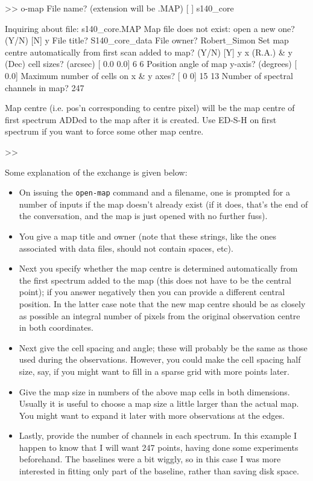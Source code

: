 \documentclass[11pt,twoside]{starlink}
\begin{document}
\begin{terminalv}
>> o-map
File name? (extension will be .MAP) [    ] s140_core

Inquiring about file: s140_core.MAP
Map file does not exist: open a new one? (Y/N) [N] y
File title? S140_core_data
File owner? Robert_Simon
Set map centre automatically from first scan added to map? (Y/N) [Y] y
x (R.A.) & y (Dec) cell sizes? (arcsec) [  0.0   0.0] 6 6
Position angle of map y-axis? (degrees) [   0.0]
Maximum number of cells on x & y axes? [  0   0] 15 13
Number of spectral channels in map? 247

Map centre (i.e. pos'n corresponding to centre pixel)
will be the map centre of first spectrum ADDed to the
map after it is created. Use ED-S-H on first spectrum
if you want to force some other map centre.

>>
\end{terminalv}

Some explanation of the exchange is given below:
\begin{itemize}
\item
On issuing the \texttt{open-map} command and a filename, one is prompted
for a number of inputs if the map doesn't already exist (if it does,
that's the end of the conversation, and the map is just opened with no
further fuss).
\item
You give a map title and owner (note that these strings, like the ones
associated with data files, should not contain spaces, etc).
\item
Next you specify whether the map centre is determined automatically
from the first spectrum added to the map (this does not have to be the
central point); if you answer negatively then you can provide a
different central position. In the latter case note that the new map
centre should be as closely as possible an integral number of pixels
from the original observation centre in both coordinates.
\item
Next give the cell spacing and angle; these will probably be the same
as those used during the observations. However, you could make the
cell spacing half size, say, if you might want to fill in a sparse
grid with more points later.
\item
Give the map size in numbers of the above map cells in both
dimensions. Usually it is useful to choose a map size a little larger
than the actual map. You might want to expand it later with more
observations at the edges.
\item
Lastly, provide the number of channels in each spectrum. In this
example I happen to know that I will want 247 points, having done
some experiments beforehand. The baselines were a bit wiggly, so in
this case I was more interested in fitting only part of the baseline,
rather than saving disk space.
\end{itemize}
\end{document}
